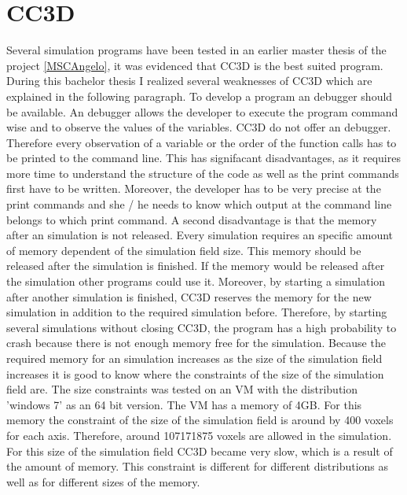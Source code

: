 \section{CC3D}
Several simulation programs have been tested in an earlier master thesis of the project \ref{MSCAngelo}, it was evidenced that \ac{CC3D} is the best suited program. During this bachelor thesis I realized several weaknesses of \ac{CC3D} which are explained in the following paragraph. \newline
To develop a program an debugger should be available. An debugger allows the developer to execute the program command wise and to observe the values of the variables. \ac{CC3D} do not offer an debugger. Therefore every observation of a variable or the order of the function calls has to be printed to the command line. This has signifacant disadvantages, as it requires more time to understand the structure of the code as well as the print commands first have to be written. Moreover, the developer has to be very precise at the print commands and she / he needs to know which output at the command line belongs to which print command. \newline
A second disadvantage is that the memory after an simulation is not released. Every simulation requires an specific amount of memory dependent of the simulation field size. This memory should be released after the simulation is finished. If the memory would be released after the simulation other programs could use it. Moreover, by starting a simulation after another simulation is finished, \ac{CC3D} reserves the memory for the new simulation in addition to the required simulation before. Therefore, by starting several simulations without closing \ac{CC3D}, the program has a high probability to crash because there is not enough memory free for the simulation. \newline
Because the required memory for an simulation increases as the size of the simulation field increases it is good to know where the constraints of the size of the simulation field are. The size constraints was tested on an \ac{VM} with the distribution 'windows 7' as an 64 bit version. The \ac{VM} has a memory of 4GB. For this memory the constraint of the size of the simulation field is around by 400 voxels for each axis. Therefore, around 107171875 voxels are allowed in the simulation. For this size of the simulation field \ac{CC3D} became very slow, which is a result of the amount of memory. This constraint is different for different distributions as well as for different sizes of the memory. 

